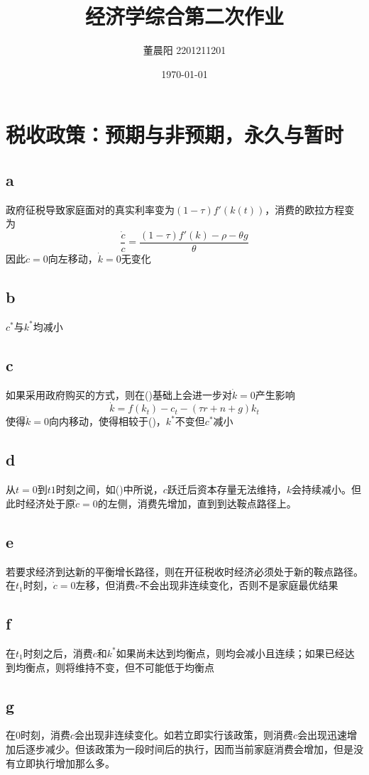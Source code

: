 \documentclass[a4paper,12pt]{ctexart}
\title{经济学综合第二次作业}
\author{董晨阳 2201211201}
\date{\today}
\begin{document}
\maketitle
\section{税收政策：预期与非预期，永久与暂时}
\subsection*{a}
政府征税导致家庭面对的真实利率变为$(1-\tau)f'(k(t))$，消费的欧拉方程变为
\begin{equation}
    \frac{\dot c}{c}=\frac{(1-\tau)f'(k)-\rho-\theta g}{\theta}
\end{equation}
因此$\dot c=0$向左移动，$\dot k=0$无变化
\subsection*{b}\label{sec:b}
$c^*$与$k^*$均减小
\subsection*{c}
如果采用政府购买的方式，则在()基础上会进一步对$\dot k=0$产生影响
\begin{equation}
    \dot k=f(k_t)-c_t-(\tau r+n+g)k_t
\end{equation}
使得$\dot k=0$向内移动，使得相较于()，$k^*$不变但$c^*$减小
\subsection*{d}
从$t=0$到$t1$时刻之间，如()中所说，$c$跃迁后资本存量无法维持，$k$会持续减小。但此时经济处于原$\dot c=0$的左侧，消费先增加，直到到达鞍点路径上。
\subsection*{e}
若要求经济到达新的平衡增长路径，则在开征税收时经济必须处于新的鞍点路径。在$t_1$时刻，$\dot c=0$左移，但消费$c$不会出现非连续变化，否则不是家庭最优结果
\subsection*{f}
在$t_1$时刻之后，消费$c$和$k^*$如果尚未达到均衡点，则均会减小且连续；如果已经达到均衡点，则将维持不变，但不可能低于均衡点
\subsection*{g}\label{sec:g}
在$0$时刻，消费$c$会出现非连续变化。如若立即实行该政策，则消费$c$会出现迅速增加后逐步减少。但该政策为一段时间后的执行，因而当前家庭消费会增加，但是没有立即执行增加那么多。
\end{document}
